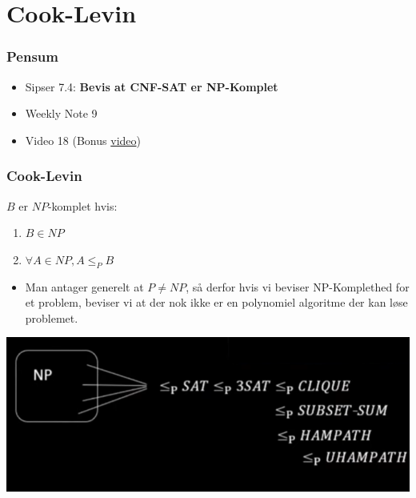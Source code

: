 \section{Cook-Levin}%
\label{sec:cooklevin}

\begin{frame}
	\frametitle{Pensum}
	\begin{itemize}
		\item Sipser 7.4: \textbf{Bevis at CNF-SAT er NP-Komplet}
		\item Weekly Note 9
		\item Video 18 (Bonus \href{https://www.youtube.com/watch?v=6Az1gtDRaAU}{video})
	\end{itemize}
\end{frame}

\begin{frame}[allowframebreaks]
	\frametitle{Cook-Levin}
	\begin{definition}
		$B$ er $NP$-komplet hvis:
		\begin{enumerate}
			\item $B \in NP$
			\item $\forall A \in NP, A \le_{P} B$
		\end{enumerate}
	\end{definition}
	\begin{itemize}
		\item Man antager generelt at $P \ne NP$, så derfor hvis vi beviser NP-Komplethed for et problem, beviser vi at der nok ikke er en polynomiel algoritme der kan løse problemet.
	\end{itemize}

	\begin{center}
		\includegraphics[scale=0.4]{figur/video16a.png}
	\end{center}


\end{frame}
